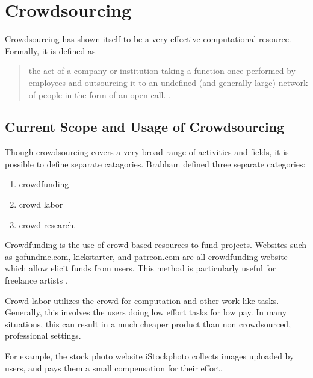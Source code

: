 
\section{Crowdsourcing}
Crowdsourcing has shown itself to be a very effective computational resource.
Formally, it is defined as
\begin{quote}
the act of a company or institution taking a function once performed by employees and outsourcing it to an undefined (and generally large) network of people in the form of an open call. \cite{brabham2008crowdsourcing}.
\end{quote}

\subsection{Current Scope and Usage of Crowdsourcing}
Though crowdsourcing covers a very broad range of activities and fields, it is possible to define separate catagories. Brabham defined three separate categories:
\begin{enumerate}
	\item crowdfunding
	\item crowd labor 
	\item crowd research.
\end{enumerate} 

Crowdfunding is the use of crowd-based resources to fund projects. Websites such as gofundme.com, kickstarter, and patreon.com are all crowdfunding website which allow elicit funds from users. 
This method is particularly useful for freelance artists \cite{brabham2008crowdsourcing}.

Crowd labor utilizes the crowd for computation and other work-like tasks. Generally, this involves the users doing low effort tasks for low pay. 
In many situations, this can result in a much cheaper product than non crowdsourced, professional settings.

For example, the stock photo website iStockphoto collects images uploaded by users, and pays them a small compensation for their effort.




